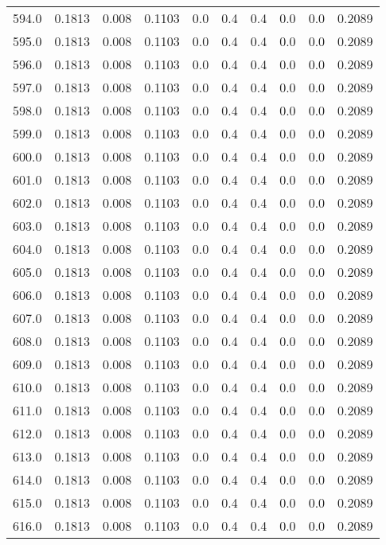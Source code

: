\begin{longtable}{lrrrrrrrrr}
594.0 & 0.1813 & 0.008 & 0.1103 & 0.0 & 0.4 & 0.4 & 0.0 & 0.0 & 0.2089 \\
595.0 & 0.1813 & 0.008 & 0.1103 & 0.0 & 0.4 & 0.4 & 0.0 & 0.0 & 0.2089 \\
596.0 & 0.1813 & 0.008 & 0.1103 & 0.0 & 0.4 & 0.4 & 0.0 & 0.0 & 0.2089 \\
597.0 & 0.1813 & 0.008 & 0.1103 & 0.0 & 0.4 & 0.4 & 0.0 & 0.0 & 0.2089 \\
598.0 & 0.1813 & 0.008 & 0.1103 & 0.0 & 0.4 & 0.4 & 0.0 & 0.0 & 0.2089 \\
599.0 & 0.1813 & 0.008 & 0.1103 & 0.0 & 0.4 & 0.4 & 0.0 & 0.0 & 0.2089 \\
600.0 & 0.1813 & 0.008 & 0.1103 & 0.0 & 0.4 & 0.4 & 0.0 & 0.0 & 0.2089 \\
601.0 & 0.1813 & 0.008 & 0.1103 & 0.0 & 0.4 & 0.4 & 0.0 & 0.0 & 0.2089 \\
602.0 & 0.1813 & 0.008 & 0.1103 & 0.0 & 0.4 & 0.4 & 0.0 & 0.0 & 0.2089 \\
603.0 & 0.1813 & 0.008 & 0.1103 & 0.0 & 0.4 & 0.4 & 0.0 & 0.0 & 0.2089 \\
604.0 & 0.1813 & 0.008 & 0.1103 & 0.0 & 0.4 & 0.4 & 0.0 & 0.0 & 0.2089 \\
605.0 & 0.1813 & 0.008 & 0.1103 & 0.0 & 0.4 & 0.4 & 0.0 & 0.0 & 0.2089 \\
606.0 & 0.1813 & 0.008 & 0.1103 & 0.0 & 0.4 & 0.4 & 0.0 & 0.0 & 0.2089 \\
607.0 & 0.1813 & 0.008 & 0.1103 & 0.0 & 0.4 & 0.4 & 0.0 & 0.0 & 0.2089 \\
608.0 & 0.1813 & 0.008 & 0.1103 & 0.0 & 0.4 & 0.4 & 0.0 & 0.0 & 0.2089 \\
609.0 & 0.1813 & 0.008 & 0.1103 & 0.0 & 0.4 & 0.4 & 0.0 & 0.0 & 0.2089 \\
610.0 & 0.1813 & 0.008 & 0.1103 & 0.0 & 0.4 & 0.4 & 0.0 & 0.0 & 0.2089 \\
611.0 & 0.1813 & 0.008 & 0.1103 & 0.0 & 0.4 & 0.4 & 0.0 & 0.0 & 0.2089 \\
612.0 & 0.1813 & 0.008 & 0.1103 & 0.0 & 0.4 & 0.4 & 0.0 & 0.0 & 0.2089 \\
613.0 & 0.1813 & 0.008 & 0.1103 & 0.0 & 0.4 & 0.4 & 0.0 & 0.0 & 0.2089 \\
614.0 & 0.1813 & 0.008 & 0.1103 & 0.0 & 0.4 & 0.4 & 0.0 & 0.0 & 0.2089 \\
615.0 & 0.1813 & 0.008 & 0.1103 & 0.0 & 0.4 & 0.4 & 0.0 & 0.0 & 0.2089 \\
616.0 & 0.1813 & 0.008 & 0.1103 & 0.0 & 0.4 & 0.4 & 0.0 & 0.0 & 0.2089 \\

\end{longtable}
